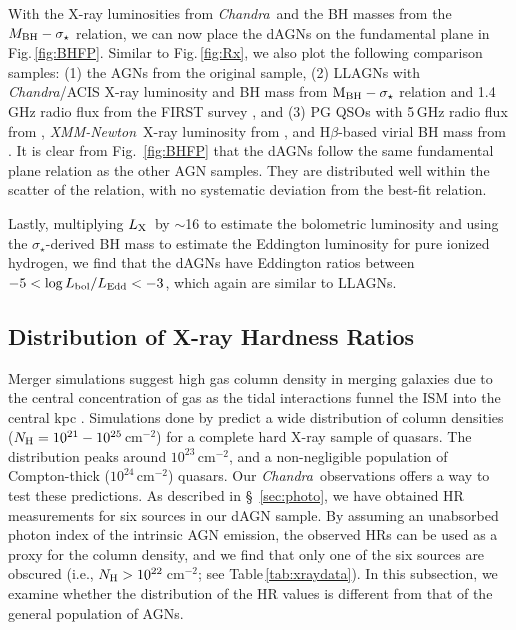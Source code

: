 \documentclass[iop,revtex4,twocolumn,apj,numberedappendix,appendixfloats]{emulateapj}
\newcommand{\lx}{$L_{\rm X}$}
\newcommand{\chandra}{{\it Chandra}}
\newcommand{\xmm}{{\it XMM-Newton}}
\begin{document}
With the X-ray luminosities from \chandra\ and the BH masses from the $M_{\rm BH}-\sigma_\star$ relation, we can now place the dAGNs on the fundamental plane in Fig.\,\ref{fig:BHFP}. Similar to Fig.\,\ref{fig:Rx}, we also plot the following comparison samples: (1) the AGNs from the original \citet{Merloni03} sample, (2) LLAGNs with \chandra/ACIS X-ray luminosity and BH mass from $\rm M_{\rm BH}-\sigma_\star$ relation \citep{She17} and 1.4\,GHz radio flux from the FIRST survey \citep{Helfand15}, and (3) PG QSOs with 5\,GHz radio flux from \citet{Kellermann89}, \xmm\ X-ray luminosity from \citet{Piconcelli05}, and H$\beta$-based virial BH mass from \citet{Lani17}. It is clear from Fig.~\ref{fig:BHFP} that the dAGNs follow the same fundamental plane relation as the other AGN samples. They are distributed well within the scatter of the relation, with no systematic deviation from the best-fit relation. 

Lastly, multiplying \lx\ by $\sim$16 to estimate the bolometric luminosity \citep{Ho08} and using the $\sigma_\star$-derived BH mass to estimate the Eddington luminosity for pure ionized hydrogen, we find that the dAGNs have Eddington ratios between $-5 < \log L_{\rm bol}/L_{\rm Edd} < -3$, which again are similar to LLAGNs.

\subsection{Distribution of X-ray Hardness Ratios} \label{sec:HR}

Merger simulations suggest high gas column density in merging galaxies due to the central concentration of gas as the tidal interactions funnel the ISM into the central kpc \citep{Hernquist89}. Simulations done by \citet{Hopkins06b} predict a wide distribution of column densities ($N_{\rm H} = 10^{21} - 10^{25}$\,cm$^{-2}$) for a complete hard X-ray sample of quasars. The distribution peaks around $10^{23}$\,cm$^{-2}$, and a non-negligible population of Compton-thick ($10^{24}$\,cm$^{-2}$) quasars. Our \chandra\ observations offers a way to test these predictions. 
As described in \S~\ref{sec:photo}, we have obtained HR measurements for six sources in our dAGN sample. By assuming an unabsorbed photon index of the intrinsic AGN emission, the observed HRs can be used as a proxy for the column density, and we find that only one of the six sources are obscured (i.e., $N_{\rm H} > 10^{22}$\,cm$^{-2}$; see Table\,\ref{tab:xraydata}). In this subsection, we examine whether the distribution of the HR values is different from that of the general population of AGNs. 
\end{document}
